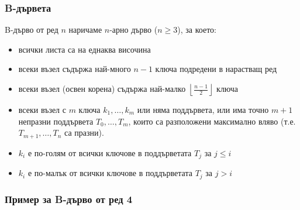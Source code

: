 \documentclass[alsotrans,beameroptions={aspectratio=169}]{beamerswitch}
\newcommand{\bnode}[5][]{
  \matrix[bnodemtx,nodes={text width=1.6em},#1]
  (#2data) { #3 \& #4 \& #5\\ };
  \matrix[bnodemtx,nodes={text width=1.2em},below=-2*\pgflinewidth of #2data.south]
  (#2next) { \&\&\& \\};
}
\begin{document}
\begin{frame}
  \frametitle{B-дървета}
  \begin{definition}[B-дърво]
    B-дърво от ред $n$ наричаме $n$-арно дърво ($n \geq 3$), за което:
    \begin{itemize}
    \item всички листа са на еднаква височина
    \item всеки възел съдържа най-много $n-1$ ключа подредени в нарастващ ред
    \item всеки възел (освен корена) съдържа най-малко $\left\lfloor\frac {n-1}2\right\rfloor$ ключа
    \item всеки възел с $m$ ключа $k_1,\ldots,k_m$ или няма поддървета, или има точно $m+1$ непразни поддървета $T_0,\ldots, T_m$, които са разположени максимално вляво (т.е. $T_{m+1},\ldots,T_n$ са празни).
    \item $k_i$ е по-голям от всички ключове в поддърветата $T_j$ за $j \leq i$
    \item $k_i$ е по-малък от всички ключове в поддърветата $T_j$ за $j > i$
    \end{itemize}
  \end{definition}
\end{frame}

\begin{frame}
  \frametitle{Пример за B-дърво от ред 4}
  \begin{center}
    \ttfamily
  \end{center}
\end{frame}
\end{document}
